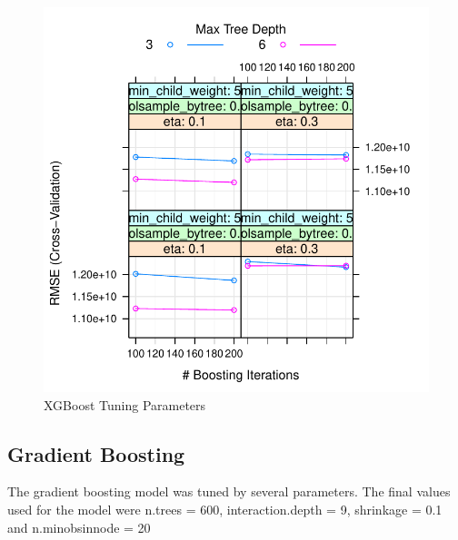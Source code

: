 \documentclass[11pt,]{article}
\begin{document}
\begin{figure}

{\centering \includegraphics{stock_analysis_files/figure-latex/XGBoost-3} 

}

\caption{XGBoost Tuning Parameters}\label{fig:XGBoost-3}
\end{figure}

\hypertarget{gradient-boosting}{%
\subsection{Gradient Boosting}\label{gradient-boosting}}

The gradient boosting model was tuned by several parameters. The final
values used for the model were n.trees = 600, interaction.depth = 9,
shrinkage = 0.1 and n.minobsinnode = 20
\end{document}
